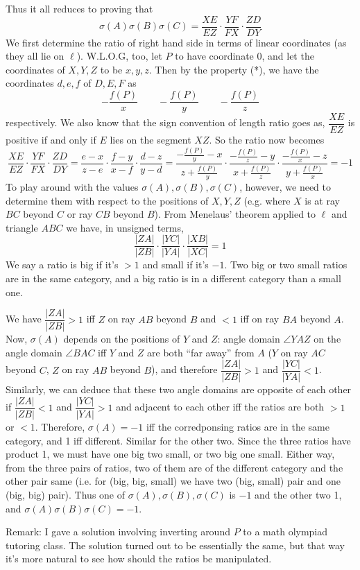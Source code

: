 \documentclass[11pt,a4paper]{article}
\begin{document}
\begin{enumerate}
\begin{itemize}
	\end{itemize}
	Thus it all reduces to proving that 
	\[\sigma(A)\sigma(B)\sigma(C) = \dfrac{XE}{EZ}\cdot\dfrac{YF}{FX}\cdot\dfrac{ZD}{DY}
	\]
	We first determine the ratio of right hand side in terms of linear coordinates (as they all lie on $\ell$). W.L.O.G, too, let $P$ to have coordinate 0, and let the coordinates of $X, Y, Z$ to be $x, y, z$. 
	Then by the property (*), we have the coordinates $d, e, f$ of $D, E, F$ as 
	\[
	-\dfrac{f(P)}{x}\qquad -\dfrac{f(P)}{y}\qquad -\dfrac{f(P)}{z}
	\]
	respectively. We also know that the sign convention of length ratio goes as, $\dfrac{XE}{EZ}$ is positive if and only if $E$ lies on the segment $XZ$. So the ratio now becomes 
	\[
	\dfrac{XE}{EZ}\cdot\dfrac{YF}{FX}\cdot\dfrac{ZD}{DY}
	=\dfrac{e-x}{z-e}\cdot\dfrac{f-y}{x-f}\cdot\dfrac{d-z}{y-d}
	=\dfrac{-\frac{f(P)}{y}-x}{z+\frac{f(P)}{y}}\cdot\dfrac{-\frac{f(P)}{z}-y}{x+\frac{f(P)}{z}}\cdot\dfrac{-\frac{f(P)}{x}-z}{y+\frac{f(P)}{x}}
	=-1
	\]
	To play around with the values $\sigma(A), \sigma(B), \sigma(C)$, however, we need to determine them with respect to the positions of $X, Y, Z$ (e.g. where $X$ is at ray $BC$ beyond $C$ or ray $CB$ beyond $B$). From Menelaus' theorem applied to $\ell$ and triangle $ABC$ we have, in unsigned terms, 
	\[
	\dfrac{|ZA|}{|ZB|}\cdot\dfrac{|YC|}{|YA|}\cdot\dfrac{|XB|}{|XC|}=1
	\]
	We say a ratio is big if it's $>1$ and small if it's $-1$. Two big or two small ratios are in the same category, and a big ratio is in a different category than a small one. 
	
	We have $\dfrac{|ZA|}{|ZB|}>1$ iff $Z$ on ray $AB$ beyond $B$ and $<1$ iff on ray $BA$ beyond $A$. 
	Now, $\sigma(A)$ depends on the positions of $Y$ and $Z$: angle domain $\angle YAZ$ on the angle domain $\angle BAC$ iff $Y$ and $Z$ are both ``far away'' from $A$ ($Y$ on ray $AC$ beyond $C$, $Z$ on ray $AB$ beyond $B$), and therefore $\dfrac{|ZA|}{|ZB|}>1$ and $\dfrac{|YC|}{|YA|}<1$. 
	Similarly, we can deduce that these two angle domains are opposite of each other if $\dfrac{|ZA|}{|ZB|}<1$ and $\dfrac{|YC|}{|YA|}>1$ and adjacent to each other iff the ratios are both $>1$ or $<1$.
	Therefore, $\sigma(A)=-1$ iff the corredponsing ratios are in the same category, and 1 iff different. Similar for the other two. Since the three ratios have product 1, we must have one big two small, or two big one small. Either way, from the three pairs of ratios, two of them are of the different category and the other pair same (i.e. for (big, big, small) we have two (big, small) pair and one (big, big) pair). 
	Thus one of $\sigma(A), \sigma(B), \sigma(C)$ is $-1$ and the other two 1, and $\sigma(A)\sigma(B)\sigma(C)=-1$. 
	
	Remark: I gave a solution involving inverting around $P$ to a math olympiad tutoring class. The solution turned out to be essentially the same, but that way it's more natural to see how should the ratios be manipulated. 
	
\end{enumerate}
\end{document}
